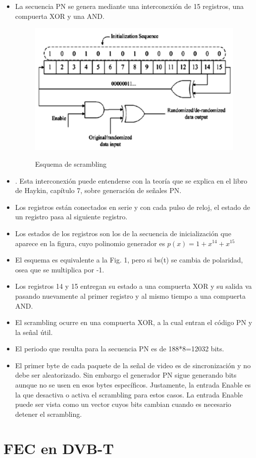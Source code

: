  \begin{itemize}
 \item  La secuencia PN se genera mediante una interconexión de 15 registros, una compuerta XOR y una AND.
 \vspace{200px}
  \begin{figure}[h!]
	\captionsetup{justification = raggedright, singlelinecheck = false}
	\caption{Esquema de scrambling} 
	\centering
	\includegraphics[scale=1]{Imagenes/Esquema-scrambling.png}
	\label{fig:Esquema-scrambling}
\end{figure}

 \item. Esta interconexión puede entenderse con la teoría que se explica en el libro de Haykin, capítulo 7, sobre generación de señales PN.
 \item Los registros están conectados en serie y con cada pulso de reloj, el estado de un registro pasa al siguiente registro.
\item Los estados de los registros son los de la secuencia de inicialización que aparece en la figura, cuyo polinomio generador es $p(x) = 1+x^{14}+x^{15}$
\item El esquema es equivalente a la Fig. 1, pero si bs(t) se cambia de polaridad, osea que se multiplica por -1.
\item Los registros 14 y 15 entregan su estado a una compuerta XOR y su salida va pasando nuevamente al primer registro y al mismo tiempo a una compuerta AND. 
\item El scrambling ocurre en una compuerta XOR, a la cual entran el código PN y la señal útil.
\item El periodo que resulta para la secuencia PN es de 188*8=12032 bits.
\item El primer byte de cada paquete de la señal de video es de sincronización y no debe ser aleatorizado. Sin embargo el generador PN sigue generando bits aunque no se usen en esos bytes específicos. Justamente, la entrada Enable es la que desactiva o activa el scrambling para estos casos. La entrada Enable puede ser vista como un vector cuyos bits cambian cuando es necesario detener el scrambling.
 \end{itemize}
 
 \section{FEC en DVB-T}